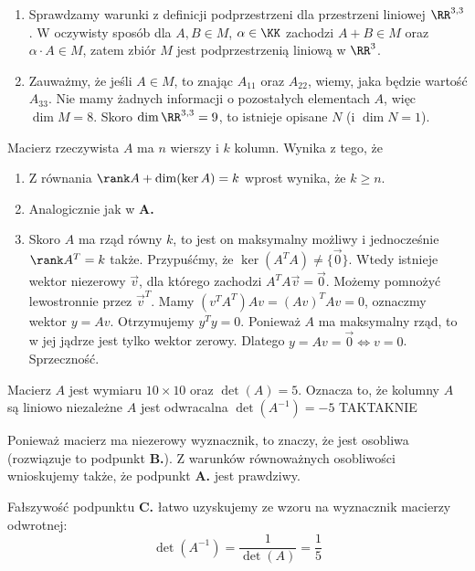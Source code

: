 \begin{solutions}
\begin{enumerate}[\bf A.]
        \item Sprawdzamy warunki z definicji podprzestrzeni dla przestrzeni liniowej $\RR^{3, 3}$. W oczywisty sposób dla $A, B \in M$, $\alpha \in \KK$ zachodzi $A + B \in M$ oraz $\alpha \cdot A \in M$, zatem zbiór $M$ jest podprzestrzenią liniową w $\RR^3$.

        \item Zauważmy, że jeśli $A \in M$, to znając $A_{11}$ oraz $A_{22}$, wiemy, jaka będzie wartość $A_{33}$. Nie mamy żadnych informacji o pozostałych elementach $A$, więc $\dim M = 8$. Skoro $\dim \RR^{3, 3} = 9$, to istnieje opisane $N$ (i $\dim N = 1$).
    \end{enumerate}

    \sol Macierz rzeczywista $A$ ma $n$ wierszy i $k$ kolumn. Wynika z tego, że

    \begin{enumerate}[\bf A.]
        \item Z równania $\rank A + \dim(\ker A) = k$ wprost wynika, że $k \geq n$.

        \item Analogicznie jak w \textbf{A.}

        \item Skoro $A$ ma rząd równy $k$, to jest on maksymalny możliwy i jednocześnie $\rank A^T=k$ także. Przypuśćmy, że $\ker(A^TA)\neq \{ \vec 0\}$. Wtedy istnieje wektor niezerowy $\vec v$, dla którego zachodzi $A^TA \vec v = \vec 0$. Możemy pomnożyć lewostronnie przez $\vec v^T$. Mamy $(v^T A^T)Av =(Av)^T Av = 0$, oznaczmy wektor $y = Av$. Otrzymujemy $y^Ty = 0$. Ponieważ $A$ ma maksymalny rząd, to w jej jądrze jest tylko wektor zerowy. Dlatego $y=Av = \vec 0 \Longleftrightarrow v = 0$. Sprzeczność.
    \end{enumerate}

    \sol Macierz $A$ jest wymiaru $10 \times 10$ oraz $\det(A) = 5$. Oznacza to, że
    \answerss
    {kolumny $A$ są liniowo niezależne}
    {$A$ jest odwracalna}
    {$\det(A^{-1}) = -5$}
    {TAK}{TAK}{NIE}

    Ponieważ macierz ma niezerowy wyznacznik, to znaczy, że jest osobliwa (rozwiązuje to podpunkt \textbf{B.}). Z warunków równoważnych osobliwości wnioskujemy także, że podpunkt \textbf{A.} jest prawdziwy.

    Fałszywość podpunktu \textbf{C.} łatwo uzyskujemy ze wzoru na wyznacznik macierzy odwrotnej: $$\det(A^{-1})=\frac{1}{\det(A)}=\frac{1}{5}$$


\end{solutions}
